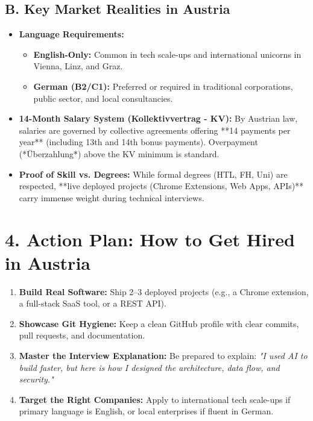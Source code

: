 \documentclass[11pt,a4paper]{article}
\begin{document}
\subsection{B. Key Market Realities in Austria}
\begin{itemize}[leftmargin=1.5em]
    \item \textbf{Language Requirements:}
    \begin{itemize}
        \item \textbf{English-Only:} Common in tech scale-ups and international unicorns in Vienna, Linz, and Graz.
        \item \textbf{German (B2/C1):} Preferred or required in traditional corporations, public sector, and local consultancies.
    \end{itemize}
    \item \textbf{14-Month Salary System (Kollektivvertrag - KV):} By Austrian law, salaries are governed by collective agreements offering **14 payments per year** (including 13th and 14th bonus payments). Overpayment (*Überzahlung*) above the KV minimum is standard.
    \item \textbf{Proof of Skill vs. Degrees:} While formal degrees (HTL, FH, Uni) are respected, **live deployed projects (Chrome Extensions, Web Apps, APIs)** carry immense weight during technical interviews.
\end{itemize}

\section{4. Action Plan: How to Get Hired in Austria}

\begin{tcolorbox}[colback=white,colframe=secondary,title=\textbf{4-Step Hiring Strategy}]
\begin{enumerate}[leftmargin=1.5em]
    \item \textbf{Build Real Software:} Ship 2--3 deployed projects (e.g., a Chrome extension, a full-stack SaaS tool, or a REST API).
    \item \textbf{Showcase Git Hygiene:} Keep a clean GitHub profile with clear commits, pull requests, and documentation.
    \item \textbf{Master the Interview Explanation:} Be prepared to explain: \textit{"I used AI to build faster, but here is how I designed the architecture, data flow, and security."}
    \item \textbf{Target the Right Companies:} Apply to international tech scale-ups if primary language is English, or local enterprises if fluent in German.
\end{enumerate}
\end{tcolorbox}
\end{document}
